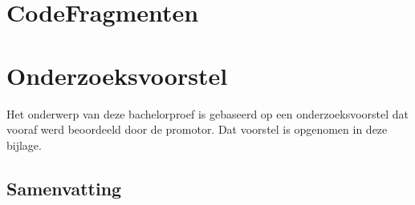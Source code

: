 \documentclass[dutch,dit,thesis]{hogentreport}
\begin{document}










%
%




\appendix{}
\chapter{CodeFragmenten}

\chapter{Onderzoeksvoorstel}

Het onderwerp van deze bachelorproef is gebaseerd op een onderzoeksvoorstel dat vooraf werd beoordeeld door de promotor. Dat voorstel is opgenomen in deze bijlage.

\section*{Samenvatting}

\end{document}
